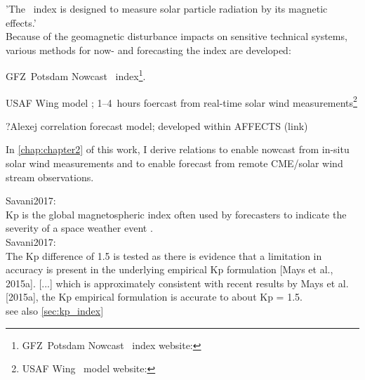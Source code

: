 'The \Kp{}~index is designed to measure solar particle radiation by its magnetic effects.'\\

Because of the geomagnetic disturbance impacts on sensitive technical systems, various methods for now- and forecasting the \Kp{} index are developed:
\begin{itemize*}
	\item GFZ~Potsdam Nowcast \Kp~index\footnote{GFZ~Potsdam Nowcast \Kp~index website: }.
	\item USAF Wing \Kp{} model \citep{Wing2005}; 1--4~hours foercast from real-time solar wind measurements\footnote{USAF Wing \Kp~model website: }
	\item ?Alexej \Kp{} correlation forecast model; developed within AFFECTS (link)
	\item In \autoref{chap:chapter2} of this work, I derive relations to enable \Kp{} nowcast from in-situ solar wind measurements and to enable \Kp{} forecast from remote CME/solar wind stream observations.
\end{itemize*}


Savani2017:\\
Kp is the global magnetospheric index often used by forecasters to indicate the severity of a space weather event \citep{Wing2005}.\\

Savani2017:\\
The Kp difference of 1.5 is tested as there is evidence that a limitation in accuracy is present in the underlying empirical Kp formulation [Mays et al., 2015a]. [...] which is approximately consistent with recent results by Mays et al. [2015a], the Kp empirical formulation is accurate to about Kp = 1.5.\\


see also \ref{sec:kp_index}\\



